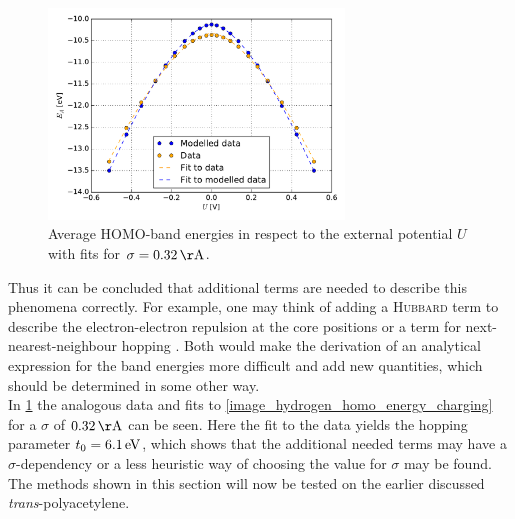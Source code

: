 \begin{figure}
	\centering
	\includegraphics[width = 0.7\textwidth]{Images/Hydrogen/charging/Homo_energy_charge_sigma_32}
	\caption{Average HOMO-band energies in respect to the external potential $U$ with fits for $\sigma = \unit[0.32]{\AA}$.}
	\label{image_hydrogen_homo_energy_charging_sigma_32}
\end{figure}
Thus it can be concluded that additional terms are needed to describe this phenomena correctly. For example, one may think of adding a \textsc{Hubbard} term to describe the electron-electron repulsion at the core positions or a term for next-nearest-neighbour hopping \cite{PhysRevLett.103.067004,PhysRevB.82.155141}. Both would make the derivation of an analytical expression for the band energies more difficult and add new quantities, which should be determined in some other way.\\ In \cref{image_hydrogen_homo_energy_charging_sigma_32} the analogous data and fits to \cref{image_hydrogen_homo_energy_charging} for a $\sigma$ of $\unit[0.32]{\AA}$ can be seen. Here the fit to the data yields the hopping parameter $t_0 = \unit[6.1]{eV}$, which shows that the additional needed terms may have a $\sigma$-dependency or a less heuristic way of choosing the value for $\sigma$ may be found.\\
The methods shown in this section will now be tested on the earlier discussed \emph{trans}-polyacetylene.
